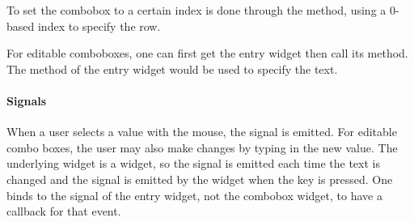 To set the combobox to a certain index is done through the
 method, using a $0$-based index to
specify the row.

For editable comboboxes, one can first get the entry widget then call
its  method. The  method of the entry
widget would be used to specify the text.


\paragraph{Signals}
When a user selects a value with the mouse, the  signal
is emitted. For editable combo boxes, the user may also make changes
by typing in the new value. The underlying widget is a 
widget, so the signal  is emitted each time the text is
changed and the signal  is emitted by the
 widget when the  key is pressed. One binds to
the signal of the entry widget, not the combobox widget, to have a
callback for that event.


